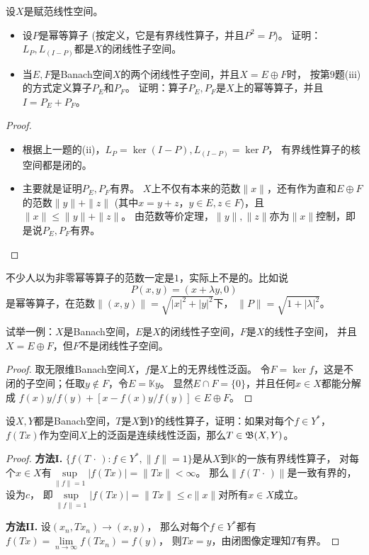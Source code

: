 \begin{10}
    设$X$是赋范线性空间。
    \begin{itemize}
        \item[(i)] 设$P$是幂等算子 (按定义，它是有界线性算子，并且$P^2=P$)。
        证明：$L_P,L_{(I-P)}$都是$X$的闭线性子空间。
        \item[(ii)] 当$E,F$是Banach空间$X$的两个闭线性子空间，并且$X=E \oplus F$时，
        按第9题(iii)的方式定义算子$P_E$和$P_F$。
        证明：算子$P_E,P_F$是$X$上的幂等算子，并且$I=P_E+P_F$。
    \end{itemize}
\end{10}
\begin{proof}
    \begin{itemize}
        \item[(i)] 根据上一题的(ii)，$L_P=\ker(I-P),L_{(I-P)}=\ker P$，
        有界线性算子的核空间都是闭的。
        \item[(ii)] 主要就是证明$P_E,P_F$有界。
        $X$上不仅有本来的范数$\|x\|$，还有作为直和$E \oplus F$的范数$\|y\|+\|z\|$
        (其中$x=y+z$，$y \in E,z \in F$)，且$\|x\|\leqslant\|y\|+\|z\|$。
        由范数等价定理，$\|y\|,\|z\|$亦为$\|x\|$控制，即是说$P_E,P_F$有界。\qedhere
    \end{itemize}
\end{proof}
\begin{remark*}
    不少人以为非零幂等算子的范数一定是$1$，实际上不是的。比如说
    \[P(x,y)=(x+\lambda y,0)\]
    是幂等算子，在范数$\|(x,y)\|=\sqrt{|x|^2+|y|^2}$下，
    $\|P\|=\sqrt{1+|\lambda|^2}$。
\end{remark*}

\begin{11}
    试举一例：$X$是Banach空间，$E$是$X$的闭线性子空间，$F$是$X$的线性子空间，
    并且$X=E \oplus F$，但$F$不是闭线性子空间。
\end{11}
\begin{proof}
    取无限维Banach空间$X$，$f$是$X$上的无界线性泛函。
    令$F=\ker f$，这是不闭的子空间；任取$y \notin F$，令$E=\mathbb{K}y$。
    显然$E \cap F=\{0\}$，并且任何$x \in X$都能分解成
    $f(x)y/f(y)+[x-f(x)y/f(y)] \in E \oplus F$。
\end{proof}

\begin{12}
    设$X,Y$都是Banach空间，$T$是$X$到$Y$的线性算子，证明：如果对每个$f\in Y^*$，
    $f(Tx)$作为空间$X$上的泛函是连续线性泛函，那么$T\in\mathfrak{B}(X,Y)$。
\end{12}
\begin{proof}
    \textbf{方法I.} $\{f(T\,\cdot\,):f\in Y^*,\|f\|=1\}$是从$X$到$\mathbb{K}$的一族有界线性算子，
    对每个$x\in X$有$\sup\limits_{\|f\|=1}|f(Tx)|=\|Tx\|<\infty$。
    那么$\|f(T\,\cdot\,)\|$是一致有界的，设为$c$，
    即$\sup\limits_{\|f\|=1}|f(Tx)|=\|Tx\|\leqslant c\|x\|$对所有$x\in X$成立。
    
    \textbf{方法II.} 设$(x_n,Tx_n)\to(x,y)$，
    那么对每个$f \in Y^*$都有$f(Tx)=\lim\limits_{n\to\infty}f(Tx_n)=f(y)$，
    则$Tx=y$，由闭图像定理知$T$有界。
\end{proof}

